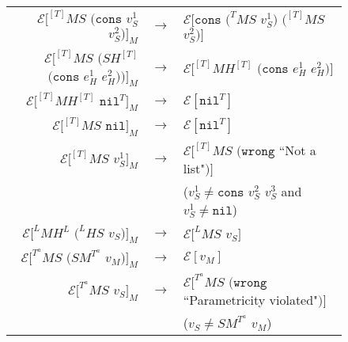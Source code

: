 \begin{figure}
\begin{center}
\begin{tabular}{rcl}
$\mathscr{E}[^{[T]}MS$ $(\mathtt{cons}$ $v_{S}^{1}$ $v_{S}^{2})]_{M}$ & $\rightarrow$ & $\mathscr{E}[\mathtt{cons}$ $(^{T}MS$ $v_{S}^{1})$ $(^{[T]}MS$ $v_{S}^{2})]$ \\
$\mathscr{E}[^{[T]}MS$ $(SH^{[T]}$ $(\mathtt{cons}$ $e_{H}^{1}$ $e_{H}^{2}))]_{M}$ & $\rightarrow$ & $\mathscr{E}[^{[T]}MH^{[T]}$ $(\mathtt{cons}$ $e_{H}^{1}$ $e_{H}^{2})]$ \\
$\mathscr{E}[^{[T]}MH^{[T]}$ $\mathtt{nil}^{T}]_{M}$ & $\rightarrow$ & $\mathscr{E}[\mathtt{nil}^{T}]$ \\
$\mathscr{E}[^{[T]}MS$ $\mathtt{nil}]_{M}$ & $\rightarrow$ & $\mathscr{E}[\mathtt{nil}^{T}]$ \\
$\mathscr{E}[^{[T]}MS$ $v_{S}^{1}]_{M}$ & $\rightarrow$ & $\mathscr{E}[^{[T]}MS$ $(\mathtt{wrong}$ ``Not a list"$)]$ \\
&& ($v_{S}^{1}\neq\mathtt{cons}$ $v_{S}^{2}$ $v_{S}^{3}$ and $v_{S}^{1}\neq\mathtt{nil}$) \\
$\mathscr{E}[^{L}MH^{L}$ $(^{L}HS$ $v_{S})]_{M}$ & $\rightarrow$ & $\mathscr{E}[^{L}MS$ $v_{S}]$ \\
$\mathscr{E}[^{T^{a}}MS$ $(SM^{T^{a}}$ $v_{M})]_{M}$ & $\rightarrow$ & $\mathscr{E}[v_{M}]$ \\
$\mathscr{E}[^{T^{a}}MS$ $v_{S}]_{M}$ & $\rightarrow$ & $\mathscr{E}[^{T^{a}}MS$ $(\mathtt{wrong}$ ``Parametricity violated"$)]$ \\
&& ($v_{S}\neq SM^{T^{a}}$ $v_{M}$)
\end{tabular}
\end{center}
\end{figure}
